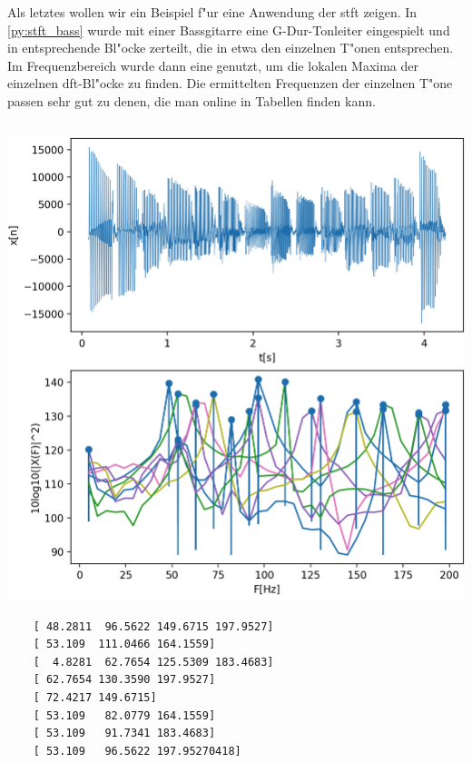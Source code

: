 Als letztes wollen wir ein Beispiel f"ur eine Anwendung der \gls{stft} zeigen. 
In \cref{py:stft_bass} wurde mit einer Bassgitarre eine G-Dur-Tonleiter eingespielt und in entsprechende Bl"ocke zerteilt, die in etwa den einzelnen T"onen entsprechen.
Im Frequenzbereich wurde dann eine  genutzt, um die lokalen Maxima der einzelnen \gls{dft}-Bl"ocke zu finden.
Die ermittelten Frequenzen der einzelnen T"one passen sehr gut zu denen, die man online in Tabellen finden kann.
\begin{listing}[ht]
    \noindent
    \begin{minipage}{0.51\textwidth}
        \strut\vspace*{-\baselineskip}\newline
        \inputminted[firstline=10, lastline=44]{python3}{code/stft_bass.py}
    \end{minipage}%
    \begin{minipage}{0.48\textwidth}
        \strut\vspace*{-\baselineskip}\newline
        \includegraphics[width=\textwidth]{code/stft_bass.png}\\
    \begin{verbatim}
    [ 48.2811  96.5622 149.6715 197.9527]
    [ 53.109  111.0466 164.1559]
    [  4.8281  62.7654 125.5309 183.4683]
    [ 62.7654 130.3590 197.9527]
    [ 72.4217 149.6715]
    [ 53.109   82.0779 164.1559]
    [ 53.109   91.7341 183.4683]
    [ 53.109   96.5622 197.95270418]
    \end{verbatim}
    \end{minipage}
    \label{py:stft_bass}
\end{listing}

